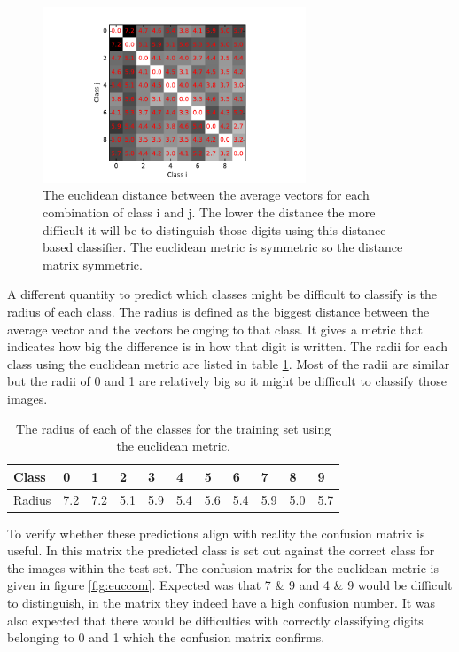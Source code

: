 \documentclass[10 pt, a4paper]{article}
\begin{document}
\begin{figure}[H] 
  \centering
    \includegraphics[width=0.7\textwidth]{eucdist}
  \caption{The euclidean distance between the average vectors for each combination of class i and j. The lower the distance the more difficult it will be to distinguish those digits using this distance based classifier. The euclidean metric is symmetric so the distance matrix symmetric. }
  \label{fig:eucdist}
\end{figure}

A different quantity to predict which classes might be difficult to classify is the radius of each class. The radius is defined as the biggest distance between the average vector and the vectors belonging to that class. It gives a metric that indicates how big the difference is in how that digit is written. The radii for each class using the euclidean metric are listed in table \ref{tab:radii}. Most of the radii are similar but the radii of 0 and 1 are relatively big so it might be difficult to classify those images.

\begin{table}[H]
\centering
\begin{tabular}{l|llllllllll}
Class  & 0   & 1   & 2   & 3   & 4   & 5   & 6   & 7   & 8   & 9   \\ \hline
Radius & 7.2 & 7.2 & 5.1 & 5.9 & 5.4 & 5.6 & 5.4 & 5.9 & 5.0 & 5.7
\end{tabular}
\caption{The radius of each of the classes for the training set using the euclidean metric.}
\label{tab:radii}
\end{table}

To verify whether these predictions align with reality the confusion matrix is useful. In this matrix the predicted class is set out against the correct class for the images within the test set. The confusion matrix for the euclidean metric is given in figure \ref{fig:euccom}. Expected was that 7 \& 9 and 4 \& 9 would be difficult to distinguish, in the matrix they indeed have a high confusion number. It was also expected that there would be difficulties with correctly classifying digits belonging to 0 and 1 which the confusion matrix confirms. 
\end{document}
